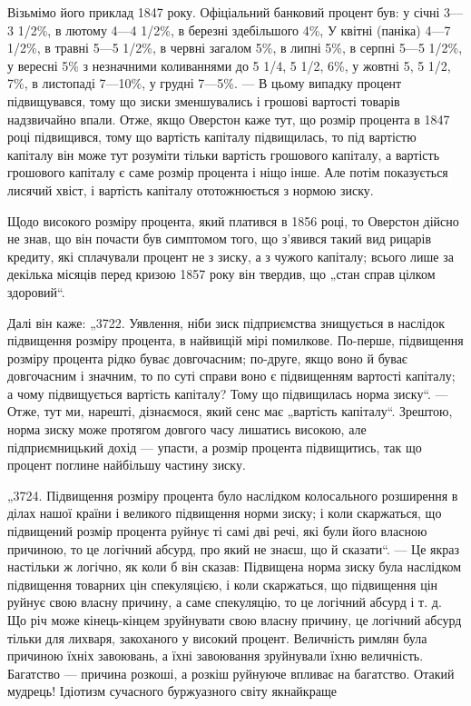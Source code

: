 Візьмімо його приклад 1847 року. Офіціальний банковий процент був: у січні 3—3 1/2\%, в лютому 4—4
1/2\%, в березні здебільшого 4\%, У квітні (паніка) 4—7 1/2\%, в травні 5—5 1/2\%, в червні загалом 5\%,
в липні 5\%, в серпні 5—5 1/2\%, у вересні 5\% з незначними
коливаннями до 5 1/4, 5 1/2, 6\%, у жовтні 5, 5 1/2, 7\%, в листопаді 7—10\%, у грудні 7—5\%. — В цьому
випадку процент підвищувався,
тому що зиски зменшувались і грошові вартості товарів надзвичайно впали. Отже, якщо Оверстон каже
тут, що розмір процента
в 1847 році підвищився, тому що вартість капіталу підвищилась,
то під вартістю капіталу він може тут розуміти тільки вартість
грошового капіталу, а вартість грошового капіталу є саме розмір
процента і ніщо інше. Але потім показується лисячий хвіст,
і вартість капіталу ототожнюється з нормою зиску.

Щодо високого розміру процента, який платився в 1856 році,
то Оверстон дійсно не знав, що він почасти був симптомом того,
що з’явився такий вид рицарів кредиту, які сплачували процент
не з зиску, а з чужого капіталу; всього лише за декілька місяців
перед кризою 1857 року він твердив, що „стан справ цілком
здоровий“.

Далі він каже: „3722. Уявлення, ніби зиск підприємства знищується в наслідок підвищення розміру
процента, в найвищій
мірі помилкове. По-перше, підвищення розміру процента рідко
буває довгочасним; по-друге, якщо воно й буває довгочасним
і значним, то по суті справи воно є підвищенням вартості капіталу; а чому підвищується вартість
капіталу? Тому що підвищилась норма зиску“. — Отже, тут ми, нарешті, дізнаємося,
який сенс має „вартість капіталу“. Зрештою, норма зиску може
протягом довгого часу лишатись високою, але підприємницький
дохід — упасти, а розмір процента підвищитись, так що процент поглине найбільшу частину зиску.

„3724. Підвищення розміру процента було наслідком колосального
розширення в ділах нашої країни і великого підвищення норми зиску; і коли скаржаться, що підвищений
розмір
процента руйнує ті самі дві речі, які були його власною причиною, то це логічний абсурд, про який не
знаєш, що й сказати“. — Це якраз настільки ж логічно, як коли б він сказав:
Підвищена норма зиску була наслідком підвищення товарних
цін спекуляцією, і коли скаржаться, що підвищення цін руйнує
свою власну причину, а саме спекуляцію, то це логічний абсурд
і т. д. Що річ може кінець-кінцем зруйнувати свою власну причину, це логічний абсурд тільки для
лихваря, закоханого у високий процент. Величність римлян була причиною їхніх завоювань,
а їхні завоювання зруйнували їхню величність. Багатство — причина
розкоші, а розкіш руйнуюче впливає на багатство. Отакий
мудрець! Ідіотизм сучасного буржуазного світу якнайкраще
\parbreak{}  %
